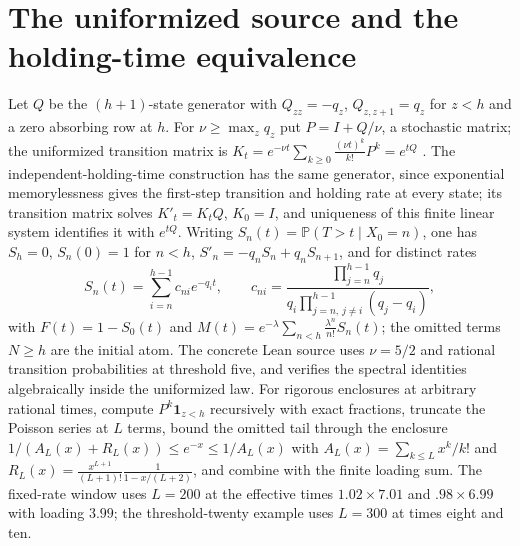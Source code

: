 \documentclass[11pt,a4paper]{article}
\theoremstyle{plain}
\theoremstyle{definition}
\theoremstyle{remark}
\newcommand{\Prob}{\mathbb P}
\newcommand{\one}{\mathbf 1}
\begin{document}
\section{The uniformized source and the holding-time equivalence}\label{app:source}
Let $Q$ be the $(h+1)$-state generator with $Q_{zz}=-q_z$, $Q_{z,z+1}=q_z$ for $z<h$ and a zero absorbing row at $h$. For $\nu\ge\max_zq_z$ put $P=I+Q/\nu$, a stochastic matrix; the uniformized transition matrix is $K_t=e^{-\nu t}\sum_{k\ge0}\frac{(\nu t)^k}{k!}P^k=e^{tQ}$ \citep{jensen1953}. The independent-holding-time construction has the same generator, since exponential memorylessness gives the first-step transition and holding rate at every state; its transition matrix solves $K'_t=K_tQ$, $K_0=I$, and uniqueness of this finite linear system identifies it with $e^{tQ}$. Writing $S_n(t)=\Prob(T>t\mid X_0=n)$, one has $S_h=0$, $S_n(0)=1$ for $n<h$, $S'_n=-q_nS_n+q_nS_{n+1}$, and for distinct rates
\begin{equation}\label{eq:spectral}
S_n(t)=\sum_{i=n}^{h-1}c_{ni}e^{-q_it},\qquad c_{ni}=\frac{\prod_{j=n}^{h-1}q_j}{q_i\prod_{j=n,\,j\ne i}^{h-1}(q_j-q_i)},
\end{equation}
with $F(t)=1-S_0(t)$ and $M(t)=e^{-\lambda}\sum_{n<h}\frac{\lambda^n}{n!}S_n(t)$; the omitted terms $N\ge h$ are the initial atom. The concrete Lean source uses $\nu=5/2$ and rational transition probabilities at threshold five, and verifies the spectral identities algebraically inside the uniformized law. For rigorous enclosures at arbitrary rational times, compute $P^k\one_{z<h}$ recursively with exact fractions, truncate the Poisson series at $L$ terms, bound the omitted tail through the enclosure $1/(A_L(x)+R_L(x))\le e^{-x}\le1/A_L(x)$ with $A_L(x)=\sum_{k\le L}x^k/k!$ and $R_L(x)=\frac{x^{L+1}}{(L+1)!}\frac1{1-x/(L+2)}$, and combine with the finite loading sum. The fixed-rate window uses $L=200$ at the effective times $1.02\times7.01$ and $.98\times6.99$ with loading $3.99$; the threshold-twenty example uses $L=300$ at times eight and ten.
\end{document}
